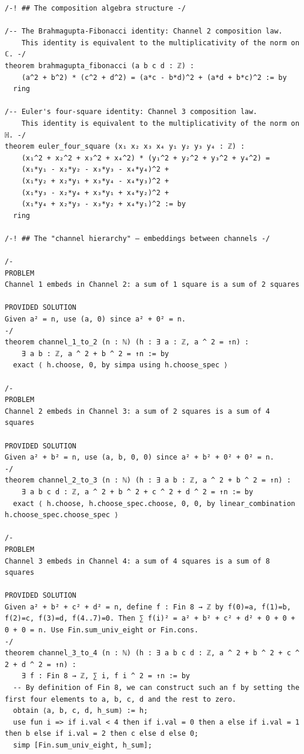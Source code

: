 \documentclass[11pt,openany]{book}
\theoremstyle{definition}
\theoremstyle{plain}
\theoremstyle{remark}
\begin{document}
\begin{lstlisting}[style=lean]
/-! ## The composition algebra structure -/

/-- The Brahmagupta-Fibonacci identity: Channel 2 composition law.
    This identity is equivalent to the multiplicativity of the norm on ℂ. -/
theorem brahmagupta_fibonacci (a b c d : ℤ) :
    (a^2 + b^2) * (c^2 + d^2) = (a*c - b*d)^2 + (a*d + b*c)^2 := by
  ring

/-- Euler's four-square identity: Channel 3 composition law.
    This identity is equivalent to the multiplicativity of the norm on ℍ. -/
theorem euler_four_square (x₁ x₂ x₃ x₄ y₁ y₂ y₃ y₄ : ℤ) :
    (x₁^2 + x₂^2 + x₃^2 + x₄^2) * (y₁^2 + y₂^2 + y₃^2 + y₄^2) =
    (x₁*y₁ - x₂*y₂ - x₃*y₃ - x₄*y₄)^2 +
    (x₁*y₂ + x₂*y₁ + x₃*y₄ - x₄*y₃)^2 +
    (x₁*y₃ - x₂*y₄ + x₃*y₁ + x₄*y₂)^2 +
    (x₁*y₄ + x₂*y₃ - x₃*y₂ + x₄*y₁)^2 := by
  ring

/-! ## The "channel hierarchy" — embeddings between channels -/

/-
PROBLEM
Channel 1 embeds in Channel 2: a sum of 1 square is a sum of 2 squares

PROVIDED SOLUTION
Given a² = n, use (a, 0) since a² + 0² = n.
-/
theorem channel_1_to_2 (n : ℕ) (h : ∃ a : ℤ, a ^ 2 = ↑n) :
    ∃ a b : ℤ, a ^ 2 + b ^ 2 = ↑n := by
  exact ⟨ h.choose, 0, by simpa using h.choose_spec ⟩

/-
PROBLEM
Channel 2 embeds in Channel 3: a sum of 2 squares is a sum of 4 squares

PROVIDED SOLUTION
Given a² + b² = n, use (a, b, 0, 0) since a² + b² + 0² + 0² = n.
-/
theorem channel_2_to_3 (n : ℕ) (h : ∃ a b : ℤ, a ^ 2 + b ^ 2 = ↑n) :
    ∃ a b c d : ℤ, a ^ 2 + b ^ 2 + c ^ 2 + d ^ 2 = ↑n := by
  exact ⟨ h.choose, h.choose_spec.choose, 0, 0, by linear_combination h.choose_spec.choose_spec ⟩

/-
PROBLEM
Channel 3 embeds in Channel 4: a sum of 4 squares is a sum of 8 squares

PROVIDED SOLUTION
Given a² + b² + c² + d² = n, define f : Fin 8 → ℤ by f(0)=a, f(1)=b, f(2)=c, f(3)=d, f(4..7)=0. Then ∑ f(i)² = a² + b² + c² + d² + 0 + 0 + 0 + 0 = n. Use Fin.sum_univ_eight or Fin.cons.
-/
theorem channel_3_to_4 (n : ℕ) (h : ∃ a b c d : ℤ, a ^ 2 + b ^ 2 + c ^ 2 + d ^ 2 = ↑n) :
    ∃ f : Fin 8 → ℤ, ∑ i, f i ^ 2 = ↑n := by
  -- By definition of Fin 8, we can construct such an f by setting the first four elements to a, b, c, d and the rest to zero.
  obtain ⟨a, b, c, d, h_sum⟩ := h;
  use fun i => if i.val < 4 then if i.val = 0 then a else if i.val = 1 then b else if i.val = 2 then c else d else 0;
  simp [Fin.sum_univ_eight, h_sum];


\end{lstlisting}
\end{document}
